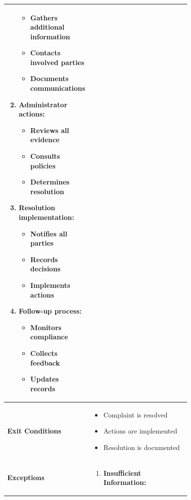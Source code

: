 \begin{center}
\begin{longtable}{|l|p{0.75\linewidth}|}
\begin{enumerate}
            \begin{itemize}
                \item Gathers additional information
                \item Contacts involved parties
                \item Documents communications
            \end{itemize}
            \item Administrator actions:
            \begin{itemize}
                \item Reviews all evidence
                \item Consults policies
                \item Determines resolution
            \end{itemize}
            \item Resolution implementation:
            \begin{itemize}
                \item Notifies all parties
                \item Records decisions
                \item Implements actions
            \end{itemize}
            \item Follow-up process:
            \begin{itemize}
                \item Monitors compliance
                \item Collects feedback
                \item Updates records
            \end{itemize}
        \end{enumerate} \\
        \hline
        \textbf{Exit Conditions}   & 
        \begin{itemize}
            \item Complaint is resolved
            \item Actions are implemented
            \item Resolution is documented
        \end{itemize} \\
        \hline
        \textbf{Exceptions}       & 
        \begin{enumerate}
            \item \textbf{Insufficient Information:} 
            \begin{itemize}

\end{itemize}
\end{enumerate}
\end{longtable}
\end{center}
